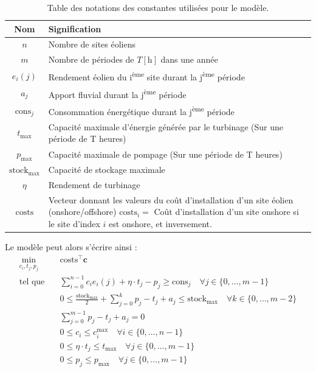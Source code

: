 \documentclass{article}
\newcommand{\unit}[1]{[\mathrm{#1}]}
\begin{document}
\begin{table}[h!]
    \centering
    \renewcommand{\arraystretch}{1.5}%
    \begin{tabular}{|c || p{14cm} |} 
        \hline
        Nom & Signification\\
        \hline\hline
        $n$ & Nombre de sites éoliens \\
        $m$ & Nombre de périodes de $T \unit{h}$ dans une année\\
        $e_i(j)$ & Rendement éolien du i\textsuperscript{ème} site durant la j\textsuperscript{ème} période\\
        $a_j$ & Apport fluvial durant la j\textsuperscript{ème} période\\
        $\mathrm{cons}_j$ & Consommation énergétique durant la j\textsuperscript{ème} période\\
        $t_\mathrm{max}$ & Capacité maximale d'énergie générée par le turbinage (Sur une période de T heures)\\
        $p_\mathrm{max}$ & Capacité maximale de pompage (Sur une période de T heures)\\
        $\mathrm{stock}_\mathrm{max}$ & Capacité de stockage maximale\\
        $\eta$ & Rendement de turbinage\\
        $\mathrm{costs}$ & Vecteur donnant les valeurs du coût d'installation d'un site éolien  (onshore/offshore) \newline $\mathrm{costs}_i = $ Coût d'installation d'un site onshore si le site d'index $i$ est onshore, et inversement.\\  
        \hline
    \end{tabular}
    \caption{Table des notations des constantes utilisées pour le modèle.}
    \label{table:notations_constantes}
\end{table}

\noindent
Le modèle peut alors s'écrire ainsi :
\begin{align}
    \min_{c_{i},t_j,p_j} \quad &\mathrm{costs}^\intercal\mathbf{c} \nonumber\\
    \textrm{tel que} \quad & \sum_{i=0}^{n-1} c_i e_i(j) + \eta \cdot t_j - p_j \ge \mathrm{cons}_j \quad \forall j \in  \{ 0, \ldots, m-1 \}\label{eq:4A_contr1}\\
    & 0 \le \frac{\mathrm{stock}_\mathrm{max}}{2}  + \sum_{j=0}^{k} p_j - t_j + a_j \le  \mathrm{stock}_\mathrm{max} \quad \forall k \in \{ 0, \ldots, m-2 \}\label{eq:4A_contr2}\\
    & \sum_{j=0}^{m-1} p_j - t_j + a_j = 0 \label{eq:4A_contr3}\\
    & 0 \le c_i \le c_i^\mathrm{max} \quad \forall i \in  \{ 0, \ldots, n-1 \}  \label{eq:4A_contr4}\\
    & 0 \le \eta \cdot t_j \le  t_\mathrm{max} \quad \forall j \in  \{ 0, \ldots, m-1 \}  \label{eq:4A_contr5}\\
    & 0 \le p_j \le  p_\mathrm{max} \quad \forall j \in  \{ 0, \ldots, m-1 \} \label{eq:4A_contr6}
\end{align}
\end{document}
